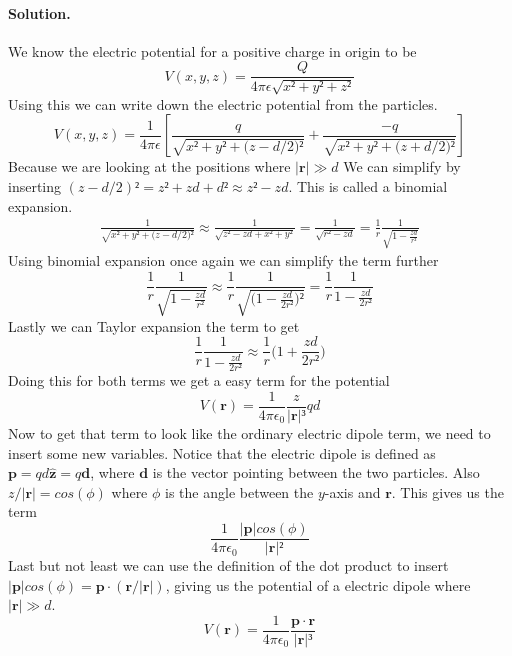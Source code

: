 \documentclass[%
oneside,                 %
final,                   %
10pt]{article}
\newenvironment{doconceexercise}{}{}
\begin{document}
\begin{doconceexercise}
\paragraph{Solution.}
We know the electric potential for a positive charge in origin to be
\begin{equation}
V(x, y, z) = \frac{Q}{4\pi \epsilon \sqrt{x² + y² + z²}}
\end{equation}
Using this we can write down the electric potential from the particles.
\begin{equation}
V(x, y, z) = \frac{1}{4\pi\epsilon}\left[\frac{q}{\sqrt{x² + y² + \big(z-d/2\big)²}} + \frac{-q}{\sqrt{x² + y² + \big(z+d/2\big)²}}\right]
\end{equation}
Because we are looking at the positions where $|\mathbf{r}|\gg d$ We can simplify by inserting $(z-d/2)² = z² + zd + d² \approx z²-zd$. This is called a binomial expansion.
\begin{align}
\frac{1}{\sqrt{x² + y² + \big(z-d/2\big)²}} \approx \frac{1}{\sqrt{z²-zd +x² + y²}} = \frac{1}{\sqrt{r² - zd}} = \frac{1}{r}\frac{1}{\sqrt{1-\frac{zd}{r²}}}
\end{align}
Using binomial expansion once again we can simplify the term further
\begin{equation}
\frac{1}{r}\frac{1}{\sqrt{1-\frac{zd}{r²}}} \approx \frac{1}{r}\frac{1}{\sqrt{\big(1-\frac{zd}{2r²}\big)²}} = \frac{1}{r}\frac{1}{1-\frac{zd}{2r²}}
\end{equation}
Lastly we can Taylor expansion the term to get
\begin{equation}
\frac{1}{r}\frac{1}{1-\frac{zd}{2r²}} \approx \frac{1}{r}\bigg(1 + \frac{zd}{2r²}\bigg)
\end{equation}
Doing this for both terms we get a easy term for the potential
\begin{equation}
V(\mathbf{r}) = \frac{1}{4\pi\epsilon_0}\frac{z}{|\mathbf{r}|³}qd
\end{equation}
Now to get that term to look like the ordinary electric dipole term, we need to insert some new variables. Notice that the electric dipole is defined as $\mathbf{p} = qd\mathbf{\hat{z}} = q\mathbf{d}$, where $\mathbf{d}$ is the vector pointing between the two particles. Also $z/|\mathbf{r}| = cos(\phi)$ where $\phi$ is the angle between the $y$-axis and $\mathbf{r}$. This gives us the term
\begin{equation}
\frac{1}{4\pi\epsilon_0}\frac{|\mathbf{p}|cos(\phi)}{|\mathbf{r}|²}
\end{equation}
Last but not least we can use the definition of the dot product to insert $|\mathbf{p}|cos(\phi) = \mathbf{p} \cdot (\mathbf{r}/|\mathbf{r}|)$, giving us the potential of a electric dipole where $|\mathbf{r}|\gg d$.
\begin{equation}
V(\mathbf{r}) = \frac{1}{4\pi\epsilon_0}\frac{\mathbf{p}\cdot\mathbf{r}}{|\mathbf{r}|³}
\end{equation}


\end{doconceexercise}
\end{document}
